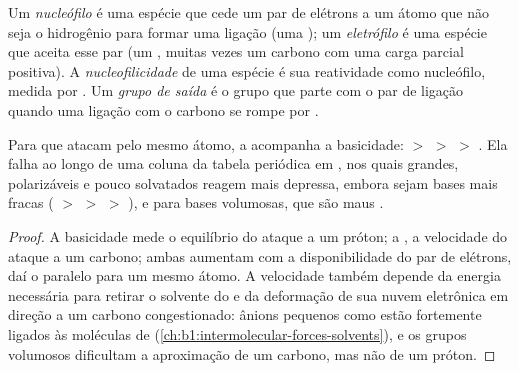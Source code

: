 \begin{definition}\label{def:b1:electronic-effects:nucleophile}
Um \emph{nucleófilo} é uma espécie que cede um par de
elétrons a um átomo que não seja o hidrogênio para formar uma ligação
(uma ); um \emph{eletrófilo} é uma espécie
que aceita esse par (um , muitas vezes um carbono com uma
carga parcial positiva). A \emph{nucleofilicidade} de
uma espécie é sua reatividade como nucleófilo, medida por . Um \emph{grupo de saída} é o grupo que
parte com o par de ligação quando uma ligação com o carbono se rompe por
.
\end{definition}

\begin{proposition}\label{prop:b1:electronic-effects:nucleophilicity-basicity}
Para  que atacam pelo mesmo átomo, a 
acompanha a basicidade:  $>$  $>$  $>$
. Ela falha ao longo de uma coluna da tabela periódica em
, nos quais  grandes, polarizáveis e pouco
solvatados reagem mais depressa, embora sejam bases mais fracas
( $>$  $>$  $>$ ), e para bases volumosas,
que são maus .
\end{proposition}

\begin{proof}
A basicidade mede o equilíbrio do ataque a um próton; a
, a velocidade do ataque a um carbono; ambas aumentam
com a disponibilidade do par de elétrons, daí o paralelo para um mesmo
átomo. A velocidade também depende da energia necessária para retirar o
solvente do  e da deformação de sua nuvem eletrônica em
direção a um carbono congestionado: ânions pequenos como  estão
fortemente ligados às moléculas de 
(\cref{ch:b1:intermolecular-forces-solvents}), e os grupos volumosos
dificultam a aproximação de um carbono, mas não de um próton.
\end{proof}

